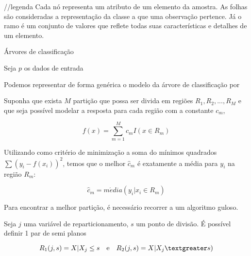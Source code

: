 //legenda
Cada nó representa um atributo de um elemento da amostra. As folhas são consideradas a representação da classe a que uma observação pertence. Já o ramo é um conjunto de valores que reflete todas suas características e detalhes de um elemento.

Árvores de classificação


Seja \begin{math}p\end{math} os dados de entrada

Podemos representar de forma genérica o modelo da árvore de classificação por


Suponha que exista \begin{math}M\end{math} partição que possa ser divida em regiões \begin{math}R_{1}, R_{2}, ..., R_{M} \end{math} e que seja possível modelar a resposta para cada região com a constante \begin{math}c_{m}\end{math}, 

\begin{equation}
f(x) = \sum_{m=1}^{M}c_{m}I( x \in R_{m} )
\end{equation}

Utilizando como critério de minimização a soma do mínimos quadrados \begin{math}\sum{ (y_{i} - f(x_{i}))^{2}}\end{math}, temos que o melhor \begin{math}\hat c_{m}\end{math} é exatamente a média para \begin{math}y_{i}\end{math} na região \begin{math}R_{m}\end{math}:

\begin{equation}
\label{eq:media}
\hat c_{m} = m\acute edia(y_{i} | x_{i} \in R_{m})
\end{equation}

Para encontrar a melhor partição, é necessário recorrer a um algoritmo guloso.

Seja \begin{math}j\end{math} uma variável de reparticionamento, $s$ um ponto de divisão. É possível definir 1 par de semi planos 

\begin{equation}
R_{1}(j,s) = {X | X_{j}\leq s} \quad \textrm{e} \quad R_{2}(j,s) = {X | X_{j}\textgreater s})
\end{equation}

